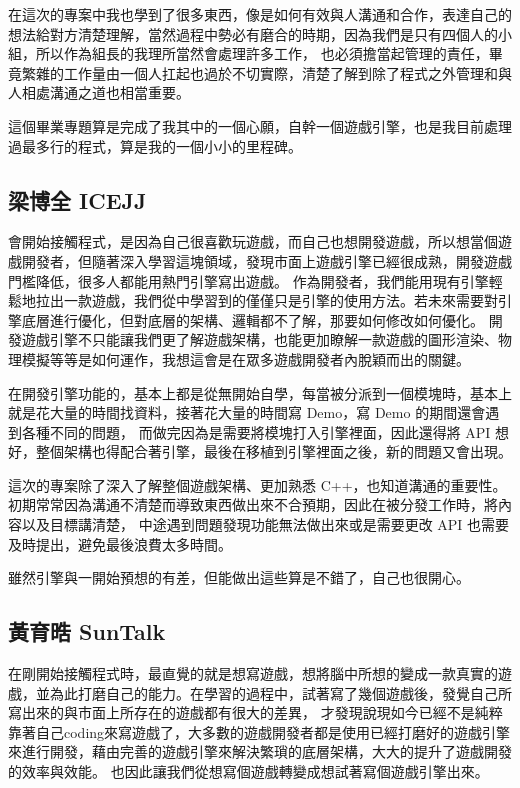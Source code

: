 在這次的專案中我也學到了很多東西，像是如何有效與人溝通和合作，表達自己的想法給對方清楚理解，當然過程中勢必有磨合的時期，因為我們是只有四個人的小組，所以作為組長的我理所當然會處理許多工作，
也必須擔當起管理的責任，畢竟繁雜的工作量由一個人扛起也過於不切實際，清楚了解到除了程式之外管理和與人相處溝通之道也相當重要。

這個畢業專題算是完成了我其中的一個心願，自幹一個遊戲引擎，也是我目前處理過最多行的程式，算是我的一個小小的里程碑。

\subsection{梁博全 ICEJJ}
\label{sec:ICEJJ}

會開始接觸程式，是因為自己很喜歡玩遊戲，而自己也想開發遊戲，所以想當個遊戲開發者，但隨著深入學習這塊領域，發現市面上遊戲引擎已經很成熟，開發遊戲門檻降低，很多人都能用熱門引擎寫出遊戲。
作為開發者，我們能用現有引擎輕鬆地拉出一款遊戲，我們從中學習到的僅僅只是引擎的使用方法。若未來需要對引擎底層進行優化，但對底層的架構、邏輯都不了解，那要如何修改如何優化。
開發遊戲引擎不只能讓我們更了解遊戲架構，也能更加瞭解一款遊戲的圖形渲染、物理模擬等等是如何運作，我想這會是在眾多遊戲開發者內脫穎而出的關鍵。

在開發引擎功能的，基本上都是從無開始自學，每當被分派到一個模塊時，基本上就是花大量的時間找資料，接著花大量的時間寫 Demo，寫 Demo 的期間還會遇到各種不同的問題，
而做完因為是需要將模塊打入引擎裡面，因此還得將 API 想好，整個架構也得配合著引擎，最後在移植到引擎裡面之後，新的問題又會出現。

這次的專案除了深入了解整個遊戲架構、更加熟悉 C++，也知道溝通的重要性。初期常常因為溝通不清楚而導致東西做出來不合預期，因此在被分發工作時，將內容以及目標講清楚，
中途遇到問題發現功能無法做出來或是需要更改 API 也需要及時提出，避免最後浪費太多時間。

雖然引擎與一開始預想的有差，但能做出這些算是不錯了，自己也很開心。

\subsection{黃育晧 SunTalk}
\label{sec:SunTalk}

在剛開始接觸程式時，最直覺的就是想寫遊戲，想將腦中所想的變成一款真實的遊戲，並為此打磨自己的能力。在學習的過程中，試著寫了幾個遊戲後，發覺自己所寫出來的與市面上所存在的遊戲都有很大的差異，
才發現說現如今已經不是純粹靠著自己coding來寫遊戲了，大多數的遊戲開發者都是使用已經打磨好的遊戲引擎來進行開發，藉由完善的遊戲引擎來解決繁瑣的底層架構，大大的提升了遊戲開發的效率與效能。
也因此讓我們從想寫個遊戲轉變成想試著寫個遊戲引擎出來。


